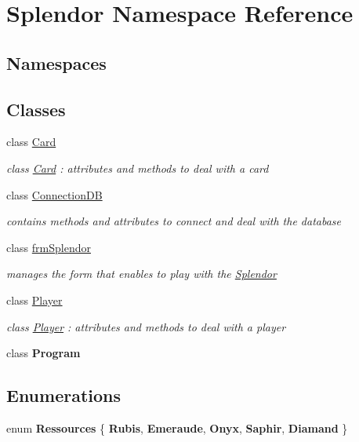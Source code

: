 \hypertarget{namespace_splendor}{}\section{Splendor Namespace Reference}
\label{namespace_splendor}
\subsection*{Namespaces}
\begin{DoxyCompactItemize}
\end{DoxyCompactItemize}
\subsection*{Classes}
\begin{DoxyCompactItemize}
\item 
class \mbox{\hyperlink{class_splendor_1_1_card}{Card}}
\begin{DoxyCompactList}\small\item\em class \mbox{\hyperlink{class_splendor_1_1_card}{Card}} \+: attributes and methods to deal with a card \end{DoxyCompactList}\item 
class \mbox{\hyperlink{class_splendor_1_1_connection_d_b}{Connection\+DB}}
\begin{DoxyCompactList}\small\item\em contains methods and attributes to connect and deal with the database \end{DoxyCompactList}\item 
class \mbox{\hyperlink{class_splendor_1_1frm_splendor}{frm\+Splendor}}
\begin{DoxyCompactList}\small\item\em manages the form that enables to play with the \mbox{\hyperlink{namespace_splendor}{Splendor}} \end{DoxyCompactList}\item 
class \mbox{\hyperlink{class_splendor_1_1_player}{Player}}
\begin{DoxyCompactList}\small\item\em class \mbox{\hyperlink{class_splendor_1_1_player}{Player}} \+: attributes and methods to deal with a player \end{DoxyCompactList}\item 
class {\bfseries Program}
\end{DoxyCompactItemize}
\subsection*{Enumerations}
\begin{DoxyCompactItemize}
\item 
\mbox{\label{namespace_splendor_abc955fe800ad5f701f777df0a2a29dc2}} 
enum {\bfseries Ressources} \{ \newline
{\bfseries Rubis}, 
{\bfseries Emeraude}, 
{\bfseries Onyx}, 
{\bfseries Saphir}, 
\newline
{\bfseries Diamand}
 \}
\end{DoxyCompactItemize}
